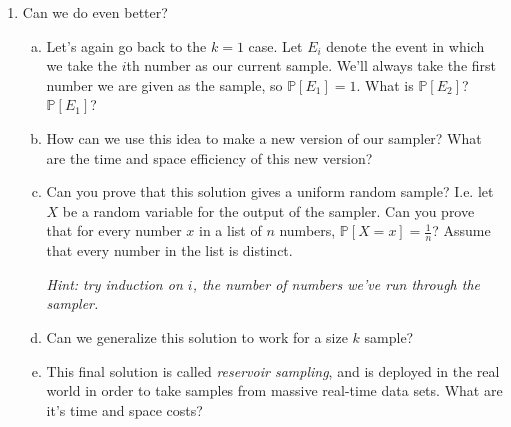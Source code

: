 \documentclass{article}
\begin{document}
\begin{enumerate}[1.]
\clearpage
\item %
  Can we do even better?

  \begin{enumerate}[a.]
  \item %
    Let's again go back to the $k=1$ case. Let $E_i$ denote the event in which
    we take the $i$th number as our current sample. We'll always take the first number we
    are given as the sample, so $\mathbb{P}[E_1] = 1$. What is
    $\mathbb{P}[E_2]$? $\mathbb{P}[E_1]$?

  \item %
    How can we use this idea to make a new version of our sampler? What are the
    time and space efficiency of this new version?

  \item %
    Can you prove that this solution gives a uniform random sample? I.e. let $X$
    be a random variable for the output of the sampler. Can you prove that for
    every number $x$ in a list of $n$ numbers, $\mathbb{P}[X = x] =
    \frac{1}{n}$? Assume that every number in the list is distinct.

    \textit{Hint: try induction on $i$, the number of numbers we've run through
      the sampler.}

  \item %
    Can we generalize this solution to work for a size $k$ sample?

  \item %
    This final solution is called \textit{reservoir sampling}, and is deployed
    in the real world in order to take samples from massive real-time data sets.
    What are it's time and space costs?

  \end{enumerate}
\end{enumerate}
\end{document}
